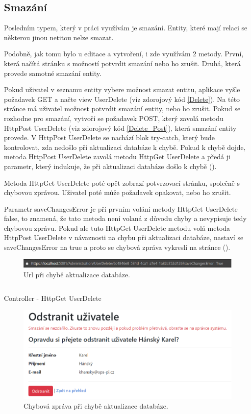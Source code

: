 \documentclass[a4paper, 12pt]{report}
\begin{document}
	\subsection{Smazání}
	Posledním typem, který v práci využívám je smazání. Entity, které mají relaci se některou jinou netitou nelze smazat.\par
	Podobně, jak tomu bylo u editace a vytvoření, i zde využívám 2 metody. První, která načítá stránku s možností potvrdit smazání nebo ho zrušit. Druhá, která provede samotné smazání entity.\par
	Pokud uživatel v seznamu entity vybere možnost smazat entitu, aplikace vyšle požadavek GET a načte view UserDelete (viz zdorojový kód \ref{Delete}). Na této stránce má uživatel možnost potvrdit smazání entity, nebo ho zrušit. Pokud se rozhodne pro smazání, vytvoří se požadavek POST, který zavolá metodu HttpPost UserDelete (viz zdorojový kód \ref{Delete_Post}), která smazání entity provede. V HttpPost UserDelete se nachází blok try-catch, který bude kontrolovat, zda nedošlo při aktualizaci databáze k chybě. Pokud k chybě dojde, metoda HttpPost UserDelete zavolá metodu HttpGet UserDelete a předá ji parametr, který indukuje, že při aktualizaci databáze došlo k chybě ().\par
	Metoda HttpGet UserDelete poté opět zobrazí potvrzovací stránku, společně s chybovou zprávou. Uživatel poté může požadavek opakovat, nebo ho zrušit.\par
	Parametr saveChangesError je při prvním volání metody HttpGet UserDelete false, to znamená, že tato metoda není volaná z důvodu chyby a nevypisuje tedy chybovou zprávu. Pokud ale tuto HttpGet UserDelete metodu volá metoda HttpPost UserDelete v návaznosti na chybu při aktualizaci databáze, nastaví se saveChangesError na true a proto se chybová zpráva vykreslí na stránce ().
	\begin{figure}[h!]
		\includegraphics[width=\textwidth]{DeleteUser_lista}
		\caption{Url při chybě aktualizace databáze.}
		\label{DeleteUser_URL}
	\end{figure}
	\begin{listing}[H]
	\inputminted{csharp}{SourceCode/Controllers/Delete.cs}
	\caption{Controller - HttpGet UserDelete}
	\label{Delete}
	\end{listing}
	\begin{figure}[h!]
		\centering
		\includegraphics[scale=0.5]{DeleteUser}
		\caption{Chybová zpráva při chybě aktualizace databáze.}
		\label{DeleteUser_ErrorMessage}
	\end{figure}
\end{document}
